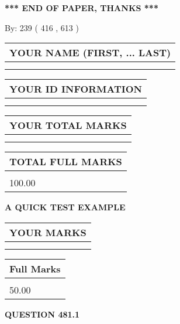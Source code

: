 \documentclass[12pt]{article}
\begin{document}
\vspace{1.0in} 
{\textbf{\large{ *** END OF PAPER, THANKS *** }}} 
   
   
\hspace{1.0in} By: 
 239 ( 416 ,  613 )
   
   
   
   
\newpage 
\setcounter{page}{ 
   481001 } 
   
   
   
   
\noindent\begin{tabular}{|l|}
\hline
YOUR NAME (FIRST, ... LAST)  \\
\hline
 \\ 
 \\ 
\hline
\end{tabular}
\hspace{0.05in} \begin{tabular}{|l|}
\hline
 YOUR   ID   INFORMATION  \\
\hline
 \\ 
 \\ 
\hline
\end{tabular}
   
   
\vspace{0.2in}\noindent\begin{tabular}{|l|}
\hline
YOUR TOTAL MARKS  \\
\hline
 \\ 
 \\ 
\hline
\end{tabular}
\hspace{0.05in} \begin{tabular}{|l|}
\hline
TOTAL FULL MARKS  \\
\hline
 \\ 
100.00 \\
\hline
\end{tabular}
   
   
 \vspace{0.2in}
{\LARGE {\textbf{ A QUICK TEST EXAMPLE}}}
   
   
  
\vspace{0.2in}
  
\noindent\begin{tabular}{|l|}
\hline
 YOUR MARKS  \\
\hline
 \\ 
 \\ 
\hline
\end{tabular}
\hspace{0.05in} \begin{tabular}{|l|}
\hline
 Full Marks  \\
\hline
 \\ 
50.00 \\
\hline
\end{tabular}
{\textbf{\Large{QUESTION
481.1 
}}}
  
\end{document}
